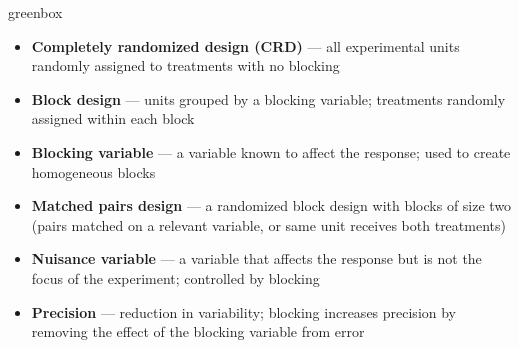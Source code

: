 \documentclass[10pt]{article}
\begin{document}
\begin{skillbox}{greenbox}
\begin{minipage}[t]{0.48\linewidth}
    \begin{itemize}
        \item \textbf{Completely randomized design (CRD)} --- all experimental units
              randomly assigned to treatments with no blocking
        \item \textbf{Block design} --- units grouped by a blocking variable; treatments
              randomly assigned within each block
        \item \textbf{Blocking variable} --- a variable known to affect the response;
              used to create homogeneous blocks
    \end{itemize}
\end{minipage}
\hfill
\begin{minipage}[t]{0.48\linewidth}
    \begin{itemize}
        \item \textbf{Matched pairs design} --- a randomized block design with blocks of
              size two (pairs matched on a relevant variable, or same unit receives
              both treatments)
        \item \textbf{Nuisance variable} --- a variable that affects the response but is
              not the focus of the experiment; controlled by blocking
        \item \textbf{Precision} --- reduction in variability; blocking increases
              precision by removing the effect of the blocking variable from error
    \end{itemize}
\end{minipage}
\end{skillbox}
\end{document}
